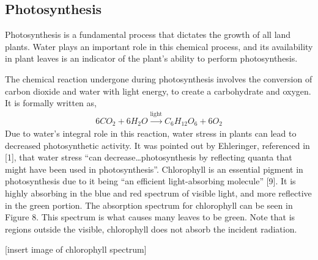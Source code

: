 \subsection{Photosynthesis}

Photosynthesis is a fundamental process that dictates the growth of all land plants.  Water plays an important role in this chemical process, and its availability in plant leaves is an indicator of the plant's ability to perform photosynthesis.

The chemical reaction undergone during photosynthesis involves the conversion of carbon dioxide and water with light energy, to create a carbohydrate and oxygen.  It is formally written as,
%
\begin{align}
    6CO_2 + 6H_2O \xrightarrow{\text{light}} C_6H_12O_6 + 6O_2
\end{align}
%
Due to water's integral role in this reaction, water stress in plants can lead to decreased photosynthetic activity.  It was pointed out by Ehleringer, referenced in [1], that water stress “can decrease…photosynthesis by reflecting quanta that might have been used in photosynthesis”.   Chlorophyll is an essential pigment in photosynthesis due to it being “an efficient light-absorbing molecule” [9].  It is highly absorbing in the blue and red spectrum of visible light, and more reflective in the green portion.  The absorption spectrum for chlorophyll can be seen in Figure 8. This spectrum is what causes many leaves to be green.  Note that is regions outside the visible, chlorophyll does not absorb the incident radiation.

[insert image of chlorophyll spectrum]
